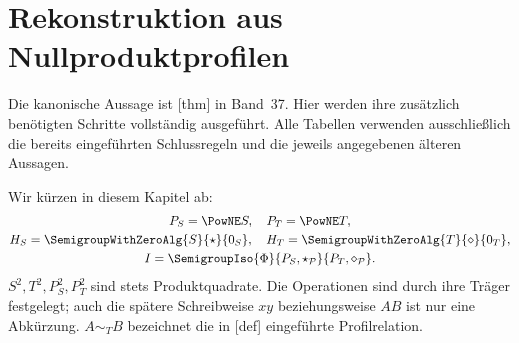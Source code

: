 \chapter{Rekonstruktion aus Nullproduktprofilen}
\hypertarget{nullproducts.proofs}{}
\hypertarget{np.proof}{}
\noindent\NullproductsMainLink{}\enspace\textperiodcentered\enspace\NullproductsReadingLink{}
\par\medskip
Die kanonische Aussage ist
[thm] in Band~37.
Hier werden ihre zusätzlich benötigten Schritte vollständig ausgeführt.
Alle Tabellen verwenden ausschließlich die bereits eingeführten
Schlussregeln und die jeweils angegebenen älteren Aussagen.

Wir kürzen in diesem Kapitel ab:
\[
 \begin{gathered}
 P_S=\PowNE S,\quad P_T=\PowNE T,\\
 H_S=\SemigroupWithZeroAlg{S}{\star}{0_S},\quad
 H_T=\SemigroupWithZeroAlg{T}{\diamond}{0_T},\\
 I=\SemigroupIso{\Phi}{P_S,\star_{\mathcal P}}{P_T,\diamond_{\mathcal P}}.
 \end{gathered}
\]
\(S^2,T^2,P_S^2,P_T^2\) sind stets Produktquadrate.
Die Operationen sind durch ihre Träger festgelegt; auch die spätere
Schreibweise \(xy\) beziehungsweise \(AB\) ist nur eine Abkürzung.
\(A\sim_T B\) bezeichnet die in
[def] eingeführte Profilrelation.

